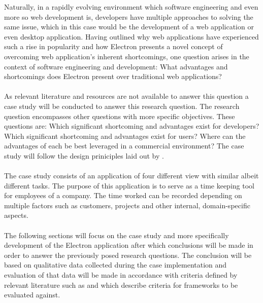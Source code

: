 
Naturally, in a rapidly evolving environment which software engineering and even more so 
web development is, developers have multiple approaches to solving the same issue, which 
in this case would be the development of a web application or even desktop application.
Having outlined why web applications have experienced such a rise in popularity and how
Electron presents a novel concept of overcoming web application's inherent shortcomings, 
one question arises in the context of software engineering and development:
What advantages and shortcomings does Electron present over traditional web applications? \paragraph{}
As relevant literature and resources are not available to answer this question a case study
will be conducted to answer this research question. 
The research question encompasses other questions with more specific objectives. 
These questions are: 
Which significant shortcoming and advantages exist for developers?
Which significant shortcoming and advantages exist for users?
Where can the advantages of each be best leveraged in a commercial environment?
The case study will follow the design priniciples laid out by \textcite{caseStudy}. \paragraph{}
The case study consists of an application of four different view with similar albeit different tasks. 
The purpose of this application is to serve as a time keeping tool for employees of a company.
The time worked can be recorded depending on multiple factors such as customers, projects and other
internal, domain-specific aspects.\paragraph{}
The following sections will focus on the case study and more specifically 
development of the Electron application after which conclusions
will be made in order to answer the previously posed research questions.
The conclusion will be based on qualitative data collected during
the case implementation and evaluation of that data will be made in 
accordance with criteria defined by relevant literature such as \textcite{frameworksEfficiency} 
and \textcite{backEndComparison} which describe criteria for frameworks to be
evaluated against.\paragraph{}